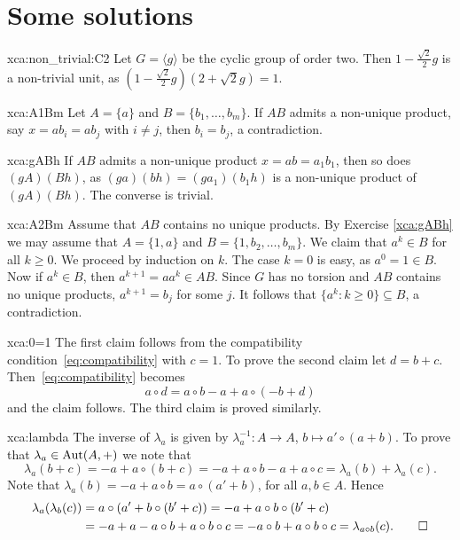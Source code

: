 \section*{Some solutions}

\pagestyle{plain}
\fancyhf{}
\fancyfoot[CE,CO]{\leftmark}
\fancyfoot[LE,RO]{\thepage}


\begin{sol}{xca:non_trivial:C2}
    Let $G=\langle g\rangle$ be the cyclic group of order two. 
    Then $1-\frac{\sqrt{2}}{2}g$ is a non-trivial unit, as 
    $\left(1-\frac{\sqrt{2}}{2}g\right)\left(2+\sqrt{2}g\right)=1$.
\end{sol}

\begin{sol}{xca:A1Bm}
    Let $A=\{a\}$ and $B=\{b_1,\dots,b_m\}$. 
    If $AB$ admits a non-unique product, say $x=ab_i=ab_j$ with $i\ne j$, 
    then $b_i=b_j$, a contradiction.
\end{sol}

\begin{sol}{xca:gABh}
    If $AB$ admits a non-unique product $x=ab=a_1b_1$, then so does $(gA)(Bh)$, as
    $(ga)(bh)=(ga_1)(b_1h)$ is a non-unique product of $(gA)(Bh)$. 
    The converse is trivial. 
\end{sol}

\begin{sol}{xca:A2Bm}
    Assume that $AB$ contains no unique products. 
    By Exercise \ref{xca:gABh} we may assume that $A=\{1,a\}$ and $B=\{1,b_2,\dots,b_m\}$. 
    We claim that $a^k\in B$ for all $k\geq0$. We proceed by induction on $k$. The case
    $k=0$ is easy, as $a^0=1\in B$. Now if $a^k\in B$, then $a^{k+1}=aa^{k}\in AB$. Since $G$ has no torsion and 
    $AB$ contains no unique products, 
    $a^{k+1}=b_j$ for some $j$. It follows that $\{a^k:k\geq0\}\subseteq B$, a contradiction. 
\end{sol}

\begin{sol}{xca:0=1}
The first claim follows from the compatibility condition~\eqref{eq:compatibility} with
$c=1$.  To prove the second claim let $d=b+c$.
Then~\eqref{eq:compatibility} becomes 
\[
	a\circ d =a\circ b-a+a\circ (-b+d)
\]
and the claim follows. The third claim is
proved similarly.
\end{sol}

\begin{sol}{xca:lambda}
The inverse of $\lambda_a$ is given by $\lambda^{-1}_a\colon A\to A$, $b\mapsto a'\circ (a+b)$. To prove
that $\lambda_a\in\operatorname{Aut}(A,+)$ we note that
\[
\lambda_a(b+c)=-a+a\circ(b+c)=-a+a\circ b-a+a\circ c=\lambda_a(b)+\lambda_a(c).
\]
Note that $\lambda_a(b)=-a+a\circ b=a\circ (a'+b)$, for all $a,b\in A$. Hence 
\begin{align*}
\lambda_a(\lambda_b(c))&=a\circ (a'+b\circ (b'+c))=-a+a\circ b\circ (b'+c)\\
&=-a+a-a\circ b+a\circ b\circ c=-a\circ b+a\circ b\circ c=\lambda_{a\circ b}(c).\qedhere    
\end{align*}
\end{sol}

